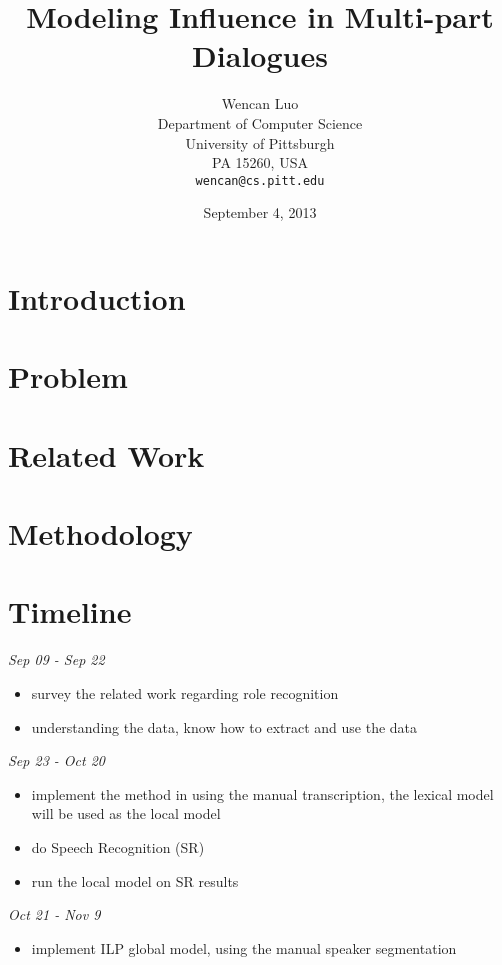 \documentclass[11pt,letterpaper]{article}
\title{Modeling Influence in Multi-part Dialogues}
\author{Wencan Luo\\
	    Department of Computer Science\\
	    University of Pittsburgh\\
	    PA 15260, USA\\
	    {\tt wencan@cs.pitt.edu}
	  }
\date{September 4, 2013}
\begin{document}
\maketitle
\begin{abstract}
  
\end{abstract}

\section{Introduction}


\section{Problem}


\section{Related Work}

\section{Methodology}

\section{Timeline}

\noindent \emph{Sep 09 - Sep 22}
\begin{itemize}
  \item survey the related work regarding role recognition
  \item understanding the data, know how to extract and use the data
\end{itemize}

\noindent \emph{Sep 23 -  Oct 20}
\begin{itemize}
  \item implement the method in \cite{Garg:2008} using the manual transcription, the lexical model will be used as the local model
  \item do Speech Recognition (SR)
  \item run the local model on SR results
\end{itemize}

\noindent \emph{Oct 21 - Nov 9}
\begin{itemize}
  \item implement ILP global model, using the manual speaker segmentation
\end{itemize}
\end{document}
